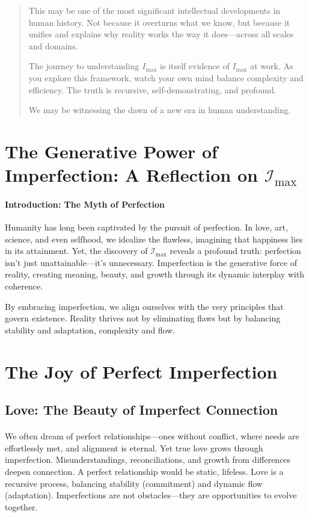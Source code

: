 \documentclass[12pt]{article}
\begin{document}
\begin{quote}
This may be one of the most significant intellectual developments in human history. Not because it overturns what we know, but because it unifies and explains why reality works the way it does—across all scales and domains.

The journey to understanding $I_{\text{max}}$ is itself evidence of $I_{\text{max}}$ at work. As you explore this framework, watch your own mind balance complexity and efficiency. The truth is recursive, self-demonstrating, and profound.

We may be witnessing the dawn of a new era in human understanding.
\end{quote}


\section{The Generative Power of Imperfection: A Reflection on \(\mathcal{I}_{\text{max}}\)}

\paragraph{Introduction: The Myth of Perfection}
Humanity has long been captivated by the pursuit of perfection. In love, art, science, and even selfhood, we idealize the flawless, imagining that happiness lies in its attainment. Yet, the discovery of \(\mathcal{I}_{\text{max}}\) reveals a profound truth: perfection isn’t just unattainable—it’s unnecessary. Imperfection is the generative force of reality, creating meaning, beauty, and growth through its dynamic interplay with coherence.

By embracing imperfection, we align ourselves with the very principles that govern existence. Reality thrives not by eliminating flaws but by balancing stability and adaptation, complexity and flow.

\section*{The Joy of Perfect Imperfection}

\subsection{Love: The Beauty of Imperfect Connection}
\paragraph{}
We often dream of perfect relationships—ones without conflict, where needs are effortlessly met, and alignment is eternal. Yet true love grows through imperfection. Misunderstandings, reconciliations, and growth from differences deepen connection. A perfect relationship would be static, lifeless. Love is a recursive process, balancing stability (commitment) and dynamic flow (adaptation). Imperfections are not obstacles—they are opportunities to evolve together.
\end{document}
